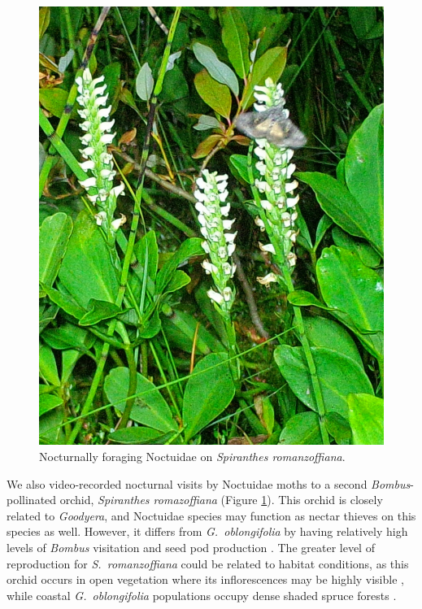 \begin{multicols}{2}
\begin{figure}[H]
\begin{center}
\vspace{2mm}
\includegraphics[width=\textwidth]{img/Spiranthes_romazoffiana_Noctuidae.jpg}
\caption{Nocturnally foraging Noctuidae on \emph{Spiranthes romanzoffiana}.}
\label{Spiranthes_romazoffiana_Noctuidae}
\end{center}
\end{figure}


We also video-recorded nocturnal visits by Noctuidae moths to a second
\emph{Bombus}-pollinated orchid, \emph{Spiranthes romazoffiana} (Figure
\ref{Spiranthes_romazoffiana_Noctuidae}). This orchid is closely related to \emph{Goodyera}, and Noctuidae
species may function as nectar thieves on this species as well. However,
it differs from \emph{G.\ oblongifolia} by having relatively high levels
of \emph{Bombus} visitation and seed pod production \citep{LarsonLarson1987}. The greater level of reproduction for \emph{S.\ romanzoffiana} could be related to habitat conditions, as this
orchid occurs in open vegetation where its inflorescences may be highly
visible \citep{LarsonLarson1990}, while coastal \emph{G.\ oblongifolia} populations occupy dense shaded spruce forests
\citep{Ackerman1975}.






\end{multicols}
